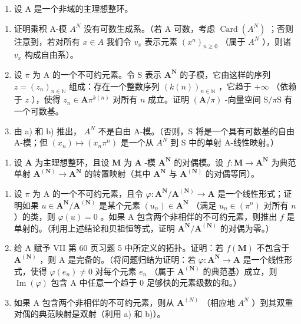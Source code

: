 \begin{enumerate}
\def\labelenumi{\arabic{enumi})}
\setcounter{enumi}{7}
\tightlist
\item
  设 A 是一个非域的主理想整环。
\end{enumerate}

\begin{enumerate}
\def\labelenumi{\alph{enumi})}
\item
  证明乘积 A-模 \(A^{N}\) 没有可数生成系。（若 A 可数，考虑 \(\operatorname{Card}(A^{N})\) ；否则注意到，若对所有 \(x \in A\) 我们令 \(v_{x}\) 表示元素 \((x^{n})_{n \geq 0}\) （属于 \(A^{N}\) ），则诸 \(v_{x}\) 构成自由系）。
\item
  设 \(\pi\) 为 A 的一个不可约元素。令 S 表示 \(\mathbf{A}^{\mathbf{N}}\) 的子模，它由这样的序列 \(z = (z_{n})_{n\in \mathbb{N}}\) 组成：存在一个整数序列 \((k(n))_{n\in \mathbb{N}}\) ，它趋于 \(+\infty\) （依赖于 \(z\) ），使得 \(z_{n}\in \mathbf{A}\pi^{k(n)}\) 对所有 \(n\) 成立。证明 \((\mathbf{A} / \pi)\) -向量空间 \(\mathrm{S} / \pi \mathrm{S}\) 有一个可数基。
\item
  由 a) 和 b) 推出， \(A^{N}\) 不是自由 A-模。（否则，S 将是一个具有可数基的自由 A-模；但 \((x_{n})\mapsto(x_{n}\pi^{n})\) 是一个从 \(A^{N}\) 到 S 中的单射 A-线性映射。）
\end{enumerate}

\begin{enumerate}
\def\labelenumi{\arabic{enumi})}
\setcounter{enumi}{8}
\tightlist
\item
  设 \(\mathbf{A}\) 为主理想整环，且设 \(\mathbf{M}\) 为 \(\mathbf{A}\) -模 \(\mathbf{A}^{\mathbf{N}}\) 的对偶模。设 \(f: \mathbf{M} \to \mathbf{A}^{\mathbf{N}}\) 为典范单射 \(\mathbf{A}^{(\mathbf{N})} \to \mathbf{A}^{\mathbf{N}}\) 的转置映射（其中 \(\mathbf{A}^{\mathbf{N}}\) 与 \(\mathbf{A}^{(\mathbf{N})}\) 的对偶等同）。
\end{enumerate}

\begin{enumerate}
\def\labelenumi{\alph{enumi})}
\item
  设 \(\pi\) 为 A 的一个不可约元素，且令 \(\varphi: \mathbf{A}^{\mathbf{N}} / \mathbf{A}^{(\mathbf{N})} \to \mathbf{A}\) 是一个线性形式；证明如果 \(u \in \mathbf{A}^{\mathbf{N}} / \mathbf{A}^{(\mathbf{N})}\) 是某个元素 \((u_n) \in \mathbf{A}^{\mathbf{N}}\) （满足 \(u_n \in (\pi^n)\) 对所有 \(n\) ）的类，则 \(\varphi(u) = 0\) 。如果 A 包含两个非相伴的不可约元素，则推出 \(f\) 是单射的。（利用上述结论和贝祖恒等式，证明 \(\mathbf{A}^{\mathbf{N}} / \mathbf{A}^{(\mathbf{N})}\) 的对偶为零。）
\item
  给 A 赋予 VII 第 60 页习题 5 中所定义的拓扑。证明：若 \(f(\mathbf{M})\) 不包含于 \(\mathbf{A}^{(\mathbf{N})}\) ，则 A 是完备的。（将问题归结为证明：若 \(\varphi : \mathbf{A}^{\mathbf{N}} \to \mathbf{A}\) 是一个线性形式，使得 \(\varphi(e_n) \neq 0\) 对每个元素 \(e_n\) （属于 \(\mathbf{A}^{(\mathbf{N})}\) 的典范基）成立，则 \(\operatorname{Im}(\varphi)\) 包含 A 中任意一个趋于 0 足够快的元素级数的和。）
\item
  如果 A 包含两个非相伴的不可约元素，则从 \(\mathbf{A}^{(N)}\) （相应地 \(A^{N}\) ）到其双重对偶的典范映射是双射（利用 a) 和 b)）。
\end{enumerate}

